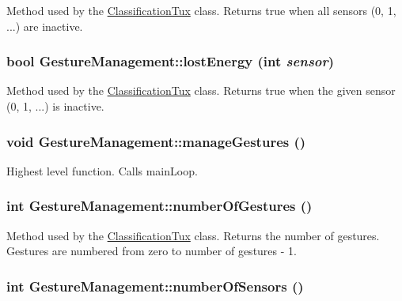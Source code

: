 \label{classGestureManagement_ad934138db81f43f1af34cacd6e080b01}
Method used by the \hyperlink{classClassificationTux}{ClassificationTux} class. Returns true when all sensors (0, 1, ...) are inactive. \hypertarget{classGestureManagement_a770a0f62af7a5b74e2e942be7234a76c}{
\subsubsection[{lostEnergy}]{\setlength{\rightskip}{0pt plus 5cm}bool GestureManagement::lostEnergy (int {\em sensor})}}
\label{classGestureManagement_a770a0f62af7a5b74e2e942be7234a76c}
Method used by the \hyperlink{classClassificationTux}{ClassificationTux} class. Returns true when the given sensor (0, 1, ...) is inactive. \hypertarget{classGestureManagement_a8bc4dbaaf02e90d32624eb756ab4d712}{
\subsubsection[{manageGestures}]{\setlength{\rightskip}{0pt plus 5cm}void GestureManagement::manageGestures ()}}
\label{classGestureManagement_a8bc4dbaaf02e90d32624eb756ab4d712}
Highest level function. Calls mainLoop. \hypertarget{classGestureManagement_aa389aa00c2f8f0bffcfb2765fda8b5dd}{
\subsubsection[{numberOfGestures}]{\setlength{\rightskip}{0pt plus 5cm}int GestureManagement::numberOfGestures ()}}
\label{classGestureManagement_aa389aa00c2f8f0bffcfb2765fda8b5dd}
Method used by the \hyperlink{classClassificationTux}{ClassificationTux} class. Returns the number of gestures. Gestures are numbered from zero to number of gestures -\/ 1. \hypertarget{classGestureManagement_a97421724eb23c9b576a731ab084410da}{
\subsubsection[{numberOfSensors}]{\setlength{\rightskip}{0pt plus 5cm}int GestureManagement::numberOfSensors ()}}
